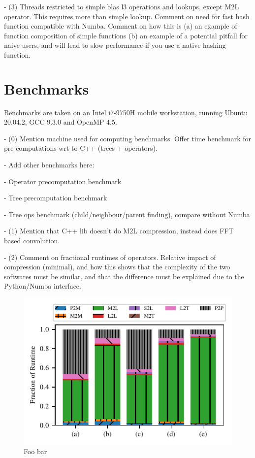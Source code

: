 \documentclass{IEEEcsmag}
\begin{document}
- (3) Threads restricted to simple blas l3 operations and lookups, except M2L operator. This requires more than simple lookup. Comment on need for fast hash function compatible with Numba. Comment on how this is (a) an example of function composition of simple functions (b) an example of a potential pitfall for naive users, and will lead to slow performance if you use a native hashing function.

\section{Benchmarks}

Benchmarks are taken on an Intel i7-9750H mobile workstation, running Ubuntu 20.04.2, GCC 9.3.0 and OpenMP 4.5.

- (0) Mention machine used for computing benchmarks. Offer time benchmark for pre-computations wrt to C++ (trees + operators).

- Add other benchmarks here:

- Operator precomputation benchmark

- Tree precomputation benchmark

- Tree ops benchmark (child/neighbour/parent finding), compare without Numba


- (1) Mention that C++ lib doesn't do M2L compression, instead does FFT based convolution.

- (2) Comment on fractional runtimes of operators. Relative impact of compression (minimal), and how this shows that the complexity of the two softwares must be similar, and that the difference must be explained due to the Python/Numba interface.

\begin{figure}
	\centerline{\includegraphics {figures/operator_runtimes.pdf}}
	\caption{Foo bar}
	\label{fig:operator_runtimes}
\end{figure}
\end{document}
